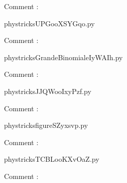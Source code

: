     Comment : 

    \clearpage
    


    \newcommand{\CaptionFigUPGooXSYGqo}{<+Type your caption here+>}
    \begin{center}
        
    \end{center}
    phystricksUPGooXSYGqo.py

    Comment : 

    \clearpage
    


    \newcommand{\CaptionFigGrandeBinomialeIyWAIh}{<+Type your caption here+>}
    \begin{center}
        
    \end{center}
    phystricksGrandeBinomialeIyWAIh.py

    Comment : 

    \clearpage
    


    \newcommand{\CaptionFigJJQWooIxyPzf}{<+Type your caption here+>}
    \begin{center}
        
    \end{center}
    phystricksJJQWooIxyPzf.py

    Comment : 

    \clearpage
    


    \newcommand{\CaptionFigfigureSZyxsvp}{<+Type your caption here+>}
    \begin{center}
        
    \end{center}
    phystricksfigureSZyxsvp.py

    Comment : 

    \clearpage
    


    \newcommand{\CaptionFigTCBLooKXvOaZ}{<+Type your caption here+>}
    \begin{center}
        
    \end{center}
    phystricksTCBLooKXvOaZ.py

    Comment : 

